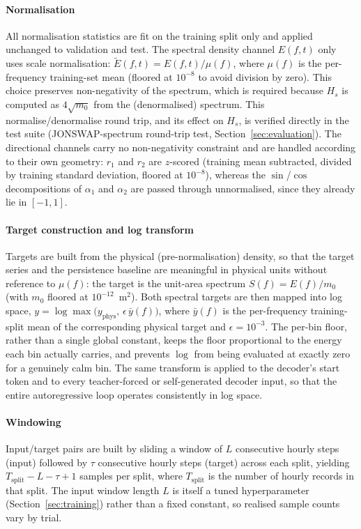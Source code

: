 \paragraph{Normalisation}
All normalisation statistics are fit on the training split only and applied unchanged to validation and test. The spectral density channel $E(f,t)$ only uses scale normalisation: $\tilde{E}(f,t) = E(f,t)/\mu(f)$, where $\mu(f)$ is
the per-frequency training-set mean (floored at $10^{-8}$ to avoid division by zero). This choice preserves non-negativity of the spectrum, which is required because $H_s$ is computed as $4\sqrt{m_0}$ from the (denormalised) spectrum. This normalise/denormalise round trip, and its effect on $H_s$, is verified directly in the test suite (JONSWAP-spectrum round-trip test, Section~\ref{sec:evaluation}). The directional channels carry no non-negativity constraint and are handled according to their own geometry: $r_1$ and $r_2$ are $z$-scored (training mean subtracted, divided by training standard deviation, floored at $10^{-8}$), whereas the $\sin$/$\cos$ decompositions of $\alpha_1$ and $\alpha_2$ are passed through unnormalised, since they already lie in $[-1,1]$.

\paragraph{Target construction and log transform}
Targets are built from the physical (pre-normalisation) density, so that the target series and the persistence baseline are meaningful in physical units without reference to $\mu(f)$: the target is the unit-area spectrum $S(f) = E(f)/m_0$ (with $m_0$ floored at $10^{-12}$~m$^2$). Both spectral targets are then mapped into log space, $y = \log \max\!\big(y_{\text{phys}},\, \epsilon\,\bar{y}(f)\big)$, where $\bar{y}(f)$ is the per-frequency training-split mean of the corresponding physical target and $\epsilon = 10^{-3}$. The per-bin floor, rather than a single global constant, keeps the floor proportional to the energy each bin actually carries, and prevents $\log$ from being evaluated at exactly zero for a genuinely calm bin. The same transform is applied to the decoder's start token and to every teacher-forced or self-generated decoder input, so that the entire autoregressive loop operates consistently in log space.

\paragraph{Windowing}
Input/target pairs are built by sliding a window of $L$ consecutive hourly steps (input) followed by $\tau$ consecutive hourly steps (target) across each split, yielding $T_{\text{split}} - L - \tau + 1$ samples per split, where $T_{\text{split}}$ is the number of hourly records in that split. The input window length $L$ is itself a tuned hyperparameter (Section~\ref{sec:training}) rather than a fixed constant, so realised sample counts vary by trial.


